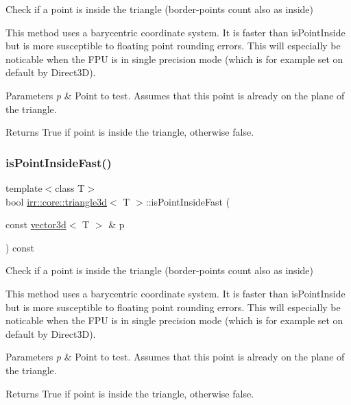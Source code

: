 Check if a point is inside the triangle (border-\/points count also as inside) 

This method uses a barycentric coordinate system. It is faster than is\+Point\+Inside but is more susceptible to floating point rounding errors. This will especially be noticable when the F\+PU is in single precision mode (which is for example set on default by Direct3D). 
\begin{DoxyParams}{Parameters}
{\em p} & Point to test. Assumes that this point is already on the plane of the triangle. \\
\hline
\end{DoxyParams}
\begin{DoxyReturn}{Returns}
True if point is inside the triangle, otherwise false. 
\end{DoxyReturn}
\mbox{\label{classirr_1_1core_1_1triangle3d_a87d93ff616faf4b99b59f8d2ecd9c0de}} 
\subsubsection{\texorpdfstring{is\+Point\+Inside\+Fast()}{isPointInsideFast()}\hspace{0.1cm}{\footnotesize\ttfamily [2/2]}}
{\footnotesize\ttfamily template$<$class T$>$ \\
bool \hyperlink{classirr_1_1core_1_1triangle3d}{irr\+::core\+::triangle3d}$<$ T $>$\+::is\+Point\+Inside\+Fast (\begin{DoxyParamCaption}\item[{const \hyperlink{classirr_1_1core_1_1vector3d}{vector3d}$<$ T $>$ \&}]{p }\end{DoxyParamCaption}) const\hspace{0.3cm}{\ttfamily [inline]}}



Check if a point is inside the triangle (border-\/points count also as inside) 

This method uses a barycentric coordinate system. It is faster than is\+Point\+Inside but is more susceptible to floating point rounding errors. This will especially be noticable when the F\+PU is in single precision mode (which is for example set on default by Direct3D). 
\begin{DoxyParams}{Parameters}
{\em p} & Point to test. Assumes that this point is already on the plane of the triangle. \\
\hline
\end{DoxyParams}
\begin{DoxyReturn}{Returns}
True if point is inside the triangle, otherwise false. 
\end{DoxyReturn}
\mbox{\label{classirr_1_1core_1_1triangle3d_a9baf7f6b0d49b8046f434cf0829eb8fd}} 
